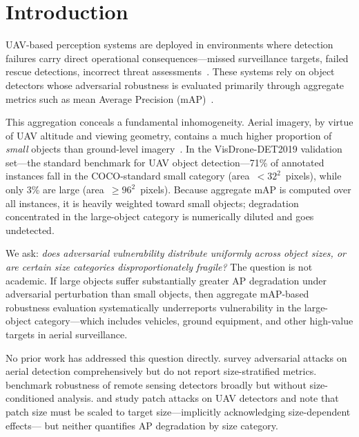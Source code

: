 \documentclass[journal]{IEEEtran}
\begin{document}
\section{Introduction}
\label{sec:intro}

UAV-based perception systems are deployed in environments where
detection failures carry direct operational consequences---missed
surveillance targets, failed rescue detections, incorrect threat
assessments~\cite{uavSecurity2025, visDrone2019}.
These systems rely on object detectors whose adversarial robustness
is evaluated primarily through aggregate metrics such as
mean Average Precision (mAP)~\cite{frontiers2024aerial, remoteSensing2024benchmark}.

This aggregation conceals a fundamental inhomogeneity.
Aerial imagery, by virtue of UAV altitude and viewing geometry,
contains a much higher proportion of \emph{small} objects than
ground-level imagery~\cite{smallObjSurvey2025}.
In the VisDrone-DET2019 validation set---the standard benchmark
for UAV object detection---71\% of annotated instances fall
in the COCO-standard small category (area~$<\!32^2$~pixels),
while only 3\% are large (area~$\geq\!96^2$~pixels).
Because aggregate mAP is computed over all instances, it is heavily
weighted toward small objects; degradation concentrated in the
large-object category is numerically diluted and goes undetected.

We ask: \emph{does adversarial vulnerability distribute uniformly
across object sizes, or are certain size categories
disproportionately fragile?}
The question is not academic.
If large objects suffer substantially greater AP degradation
under adversarial perturbation than small objects,
then aggregate mAP-based robustness evaluation
systematically underreports vulnerability in the large-object
category---which includes vehicles, ground equipment, and
other high-value targets in aerial surveillance.

No prior work has addressed this question directly.
\citet{frontiers2024aerial} survey adversarial attacks on aerial
detection comprehensively but do not report size-stratified metrics.
\citet{remoteSensing2024benchmark} benchmark robustness of
remote sensing detectors broadly but without size-conditioned
analysis. \citet{patchNoobj2024} and \citet{adYolo2024} study patch
attacks on UAV detectors and note that patch size must be scaled
to target size---implicitly acknowledging size-dependent effects---
but neither quantifies AP degradation by size category.
\end{document}
